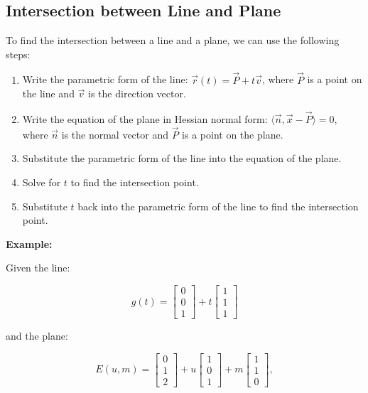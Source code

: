 \subsection{Intersection between Line and Plane}

To find the intersection between a line and a plane, we can use the following steps:

\begin{enumerate}

	\item Write the parametric form of the line: \(\vec{r}(t) = \vec{P} + t\vec{v}\), where \(\vec{P}\) is a point on the line and \(\vec{v}\) is the direction vector.

	\item Write the equation of the plane in Hessian normal form: \(\langle \vec{n}, \vec{x} - \vec{P} \rangle = 0\), where \(\vec{n}\) is the normal vector and \(\vec{P}\) is a point on the plane.

	\item Substitute the parametric form of the line into the equation of the plane.

	\item Solve for \(t\) to find the intersection point.

	\item Substitute \(t\) back into the parametric form of the line to find the intersection point.

\end{enumerate}

\textbf{Example:}

Given the line:

\[
	g(t) = \begin{bmatrix} 0 \\ 0 \\ 1 \end{bmatrix} + t \begin{bmatrix} 1 \\ 1 \\ 1 \end{bmatrix}
\]

and the plane:

\[
	E(u, m) = \begin{bmatrix} 0 \\ 1 \\ 2 \end{bmatrix} + u \begin{bmatrix} 1 \\ 0 \\ 1 \end{bmatrix} + m \begin{bmatrix} 1 \\ 1 \\ 0 \end{bmatrix},
\]

